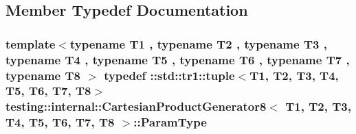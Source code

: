 \subsection{Member Typedef Documentation}
\hypertarget{classtesting_1_1internal_1_1CartesianProductGenerator8_ac0ce78b904e9a155d0f0711b9012ec0b}{
\subsubsection[{Param\-Type}]{\setlength{\rightskip}{0pt plus 5cm}template$<$typename T1 , typename T2 , typename T3 , typename T4 , typename T5 , typename T6 , typename T7 , typename T8 $>$ typedef \-::{\bf std\-::tr1\-::tuple}$<$T1, T2, T3, T4, T5, T6, T7, T8$>$ {\bf testing\-::internal\-::\-Cartesian\-Product\-Generator8}$<$ T1, T2, T3, T4, T5, T6, T7, T8 $>$\-::{\bf Param\-Type}}}\label{classtesting_1_1internal_1_1CartesianProductGenerator8_ac0ce78b904e9a155d0f0711b9012ec0b}


